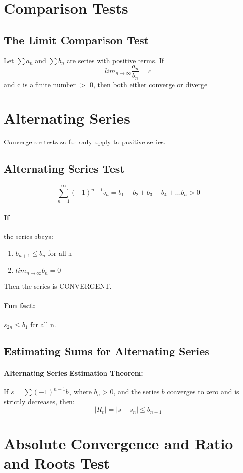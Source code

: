 \documentclass[a4paper,12pt]{report}
\begin{document}
\section{Comparison Tests}
\subsection{The Limit Comparison Test}
Let $\sum a_n$ and $\sum b_n$ are series with positive terms. If $$lim_{n \to \infty} \frac{a_n}{b_n} = c$$ and c is a finite number $>$ 0, then both either converge or diverge.

\section{Alternating Series}
Convergence tests so far only apply to positive series. 
\subsection{Alternating Series Test}
$$\sum_{n=1}^{\infty} (-1)^{n-1} b_n = b_1 - b_2 + b_3 - b_4 + ... b_n > 0$$
\paragraph{If } the series obeys:
\begin{enumerate}
\item $b_{n+1} \leq b_n$ for all n
\item $lim_{n \to \infty} b_n = 0$
\end{enumerate}
Then the series is CONVERGENT.

\paragraph{Fun fact: } $s_{2n} \leq b_1$ for all n. 

\subsection{Estimating Sums for Alternating Series}
\paragraph{Alternating Series Estimation Theorem: } If $s = \sum (-1)^{n-1} b_n$ where $b_n$ > 0, and the series $b$ converges to zero and is strictly decreases, then:
$$ |R_n| = |s-s_n| \leq b_{n+1} $$

\section{Absolute Convergence and Ratio and Roots Test}
\end{document}
